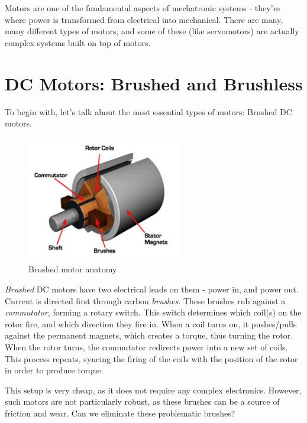  Motors are one of the fundamental aspects of mechatronic systems - they're where power is transformed from electrical into mechanical. There are many, many different types of motors, and some of these (like servomotors) are actually complex systems built on top of motors.

\section{DC Motors: Brushed and Brushless}
To begin with, let's talk about the most essential types of motors: Brushed DC motors.

\begin{figure}[H]\centering
\includegraphics[width=0.6\textwidth]{imgs/img_Mechatronics_Motors_brushed.png}
\caption{Brushed motor anatomy}
\end{figure}

\textit{Brushed} DC motors have two electrical leads on them - power in, and power out. Current is directed first through carbon \textit{brushes}. These brushes rub against a \textit{commutator}, forming a rotary switch. This switch determines which coil(s) on the rotor fire, and which direction they fire in. When a coil turns on, it pushes/pulls against the permanent magnets, which creates a torque, thus turning the rotor. When the rotor turns, the commutator redirects power into a new set of coils. This process repeats, syncing the firing of the coils with the position of the rotor in order to produce torque. 


This setup is very cheap, as it does not require any complex electronics. However, such motors are not particularly robust, as these brushes can be a source of friction and wear. Can we eliminate these problematic brushes?

